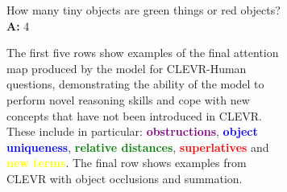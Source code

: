 \documentclass[fleqn]{article}
\begin{document}
\begin{figure}[t]
\begin{minipage}{0.55\textwidth}
\begin{figure}[t]
\begin{minipage}{0.49\textwidth}
\scriptsize

{} How many tiny objects are green things or red objects? {\normalfont\textbf{A:}} 4 \textcolor{lime}{}
\end{minipage}

\caption{The first five rows show examples of the final attention map produced by the model for CLEVR-Human questions, demonstrating the ability of the model to perform novel reasoning skills and cope with new concepts that have not been introduced in CLEVR. These include in particular: \textcolor{purple}{\textbf{obstructions}}, \textcolor{blue}{\textbf{object uniqueness}}, \textcolor{green}{\textbf{relative distances}}, \textcolor{red}{\textbf{superlatives}} and \textcolor{yellow}{\textbf{new terms}}. The final row shows examples from CLEVR with object occlusions and summation.}
\label{fig:hexample_supp}
\label{hexample_supp}
\end{figure}



\begin{figure}[t]
\captionsetup[subfloat]{labelformat=empty}
\centering
\begin{minipage}{0.11\textwidth}
\centering
{}
\end{minipage}
\begin{minipage}{0.88\textwidth}
\hfill
{}
\hfill
{}
\hfill
{}
\end{minipage}

\begin{minipage}{0.11\textwidth}
\centering
{}
\end{minipage}
\begin{minipage}{0.88\textwidth}
\hfill
{}
\hfill
{}
\hfill
{}
\end{minipage}

\begin{minipage}{0.11\textwidth}
\centering
{}
\end{minipage}
\begin{minipage}{0.88\textwidth}
\hfill
{}
\hfill
{}
\hfill
{}
\end{minipage}


\end{figure}
\end{minipage}
\end{figure}
\end{document}
